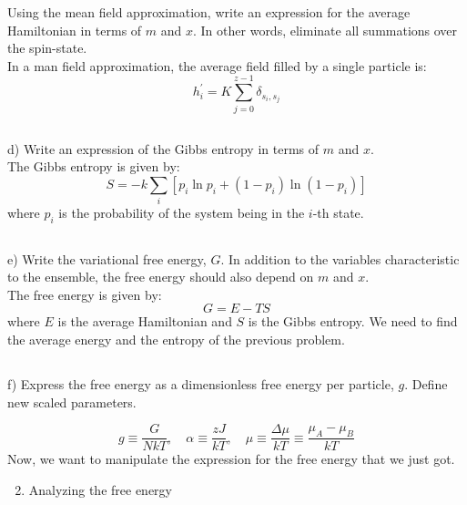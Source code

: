 \documentclass[12pt]{article}
\begin{document}
Using the mean field approximation, write an expression for the average Hamiltonian in terms of $m$ and $x$. In other words, eliminate all summations over the spin-state.\\
In a man field approximation, the average field filled by a single particle is:
\begin{equation}
  h_i^{\prime} = K \sum_{j=0}^{z-1} \delta _{s_{i},s_{j}} \tag{3}
\end{equation}
\subsection{}
d) Write an expression of the Gibbs entropy in terms of $m$ and $x$.\\
The Gibbs entropy is given by:
\begin{equation}
  S=-k \sum_{i} \left[p_{i} \ln p_{i}+\left(1-p_{i}\right) \ln \left(1-p_{i}\right)\right] \tag{4}
\end{equation}
where $p_{i}$ is the probability of the system being in the $i$-th state.
\subsection{}
e) Write the variational free energy, $G$. In addition to the variables characteristic to the ensemble, the free energy should also depend on $m$ and $x$.\\
The free energy is given by:
\begin{equation}
  G=E-TS
\end{equation}
where $E$ is the average Hamiltonian and $S$ is the Gibbs entropy. We need to find the average energy and the entropy of the previous problem.
\subsection{}

f) Express the free energy as a dimensionless free energy per particle, $g$. Define new scaled parameters.


\begin{equation*}
g \equiv \frac{G}{N k T}, \quad \alpha \equiv \frac{z J}{k T}, \quad \mu \equiv \frac{\Delta \mu}{k T} \equiv \frac{\mu_{A}-\mu_{B}}{k T} \tag{3}
\end{equation*}
Now, we want to manipulate the expression for the free energy that we just got.

\begin{enumerate}
  \setcounter{enumi}{1}
  \item Analyzing the free energy
\end{enumerate}
\end{document}
